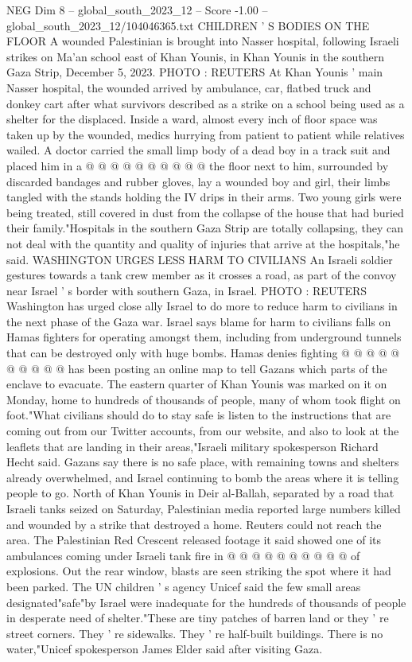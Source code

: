 \begin{textsample}{NEG Dim 8 – global\_south\_2023\_12 – Score -1.00 – global\_south\_2023\_12/104046365.txt}
CHILDREN ' S BODIES ON THE FLOOR A wounded Palestinian is brought into Nasser hospital, following Israeli strikes on Ma'an school east of Khan Younis, in Khan Younis in the southern Gaza Strip, December 5, 2023.
PHOTO : REUTERS At Khan Younis ' main Nasser hospital, the wounded arrived by ambulance, car, flatbed truck and donkey cart after what survivors described as a strike on a school being used as a shelter for the displaced.
Inside a ward, almost every inch of floor space was taken up by the wounded, medics hurrying from patient to patient while relatives wailed.
A doctor carried the small limp body of a dead boy in a track suit and placed him in a @ @ @ @ @ @ @ @ @ @ the floor next to him, surrounded by discarded bandages and rubber gloves, lay a wounded boy and girl, their limbs tangled with the stands holding the IV drips in their arms.
Two young girls were being treated, still covered in dust from the collapse of the house that had buried their family."Hospitals in the southern Gaza Strip are totally collapsing, they can not deal with the quantity and quality of injuries that arrive at the hospitals,"he said.
WASHINGTON URGES LESS HARM TO CIVILIANS An Israeli soldier gestures towards a tank crew member as it crosses a road, as part of the convoy near Israel ' s border with southern Gaza, in Israel.
PHOTO : REUTERS Washington has urged close ally Israel to do more to reduce harm to civilians in the next phase of the Gaza war.
Israel says blame for harm to civilians falls on Hamas fighters for operating amongst them, including from underground tunnels that can be destroyed only with huge bombs.
Hamas denies fighting @ @ @ @ @ @ @ @ @ @ has been posting an online map to tell Gazans which parts of the enclave to evacuate.
The eastern quarter of Khan Younis was marked on it on Monday, home to hundreds of thousands of people, many of whom took flight on foot."What civilians should do to stay safe is listen to the instructions that are coming out from our Twitter accounts, from our website, and also to look at the leaflets that are landing in their areas,"Israeli military spokesperson Richard Hecht said.
Gazans say there is no safe place, with remaining towns and shelters already overwhelmed, and Israel continuing to bomb the areas where it is telling people to go.
North of Khan Younis in Deir al-Ballah, separated by a road that Israeli tanks seized on Saturday, Palestinian media reported large numbers killed and wounded by a strike that destroyed a home.
Reuters could not reach the area.
The Palestinian Red Crescent released footage it said showed one of its ambulances coming under Israeli tank fire in @ @ @ @ @ @ @ @ @ @ of explosions.
Out the rear window, blasts are seen striking the spot where it had been parked.
The UN children ' s agency Unicef said the few small areas designated"safe"by Israel were inadequate for the hundreds of thousands of people in desperate need of shelter."These are tiny patches of barren land or they ' re street corners.
They ' re sidewalks.
They ' re half-built buildings.
There is no water,"Unicef spokesperson James Elder said after visiting Gaza.

\end{textsample}
